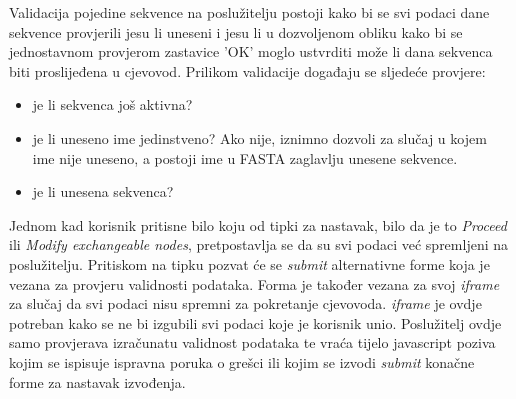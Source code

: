 Validacija pojedine sekvence na poslužitelju postoji kako bi se svi podaci dane
sekvence provjerili jesu li uneseni i jesu li u dozvoljenom obliku kako bi se
jednostavnom provjerom zastavice 'OK' moglo ustvrditi može li dana sekvenca biti
proslijeđena u cjevovod. Prilikom validacije događaju se sljedeće provjere:

\begin{itemize}

\item je li sekvenca još aktivna?

\item je li uneseno ime jedinstveno? Ako nije, iznimno dozvoli za slučaj u kojem
ime nije uneseno, a postoji ime u FASTA zaglavlju unesene sekvence.

\item je li unesena sekvenca?

\end{itemize}

Jednom kad korisnik pritisne bilo koju od tipki za nastavak, bilo da je to
\emph{Proceed} ili \emph{Modify exchangeable nodes}, pretpostavlja se da su svi
podaci već spremljeni na poslužitelju. Pritiskom na tipku pozvat će se
\emph{submit} alternativne forme koja je vezana za provjeru validnosti podataka.
Forma je također vezana za svoj \emph{iframe} za slučaj da svi podaci nisu
spremni za pokretanje cjevovoda. \emph{iframe} je ovdje potreban kako se ne bi
izgubili svi podaci koje je korisnik unio.  Poslužitelj ovdje samo provjerava
izračunatu validnost podataka te vraća tijelo javascript poziva kojim se
ispisuje ispravna poruka o grešci ili kojim se izvodi \emph{submit} konačne
forme za nastavak izvođenja.

